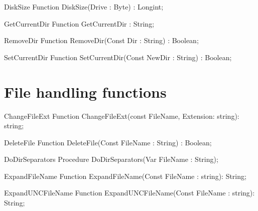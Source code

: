  
\begin{function}{DiskSize}
\Declaration
Function DiskSize(Drive : Byte) : Longint;
\Description
\Errors
\SeeAlso
\end{function}

 
\begin{function}{GetCurrentDir}
\Declaration
Function GetCurrentDir : String;
\Description
\Errors
\SeeAlso
\end{function}

 
\begin{function}{RemoveDir}
\Declaration
Function RemoveDir(Const Dir : String) : Boolean;
\Description
\Errors
\SeeAlso
\end{function}

 
\begin{function}{SetCurrentDir}
\Declaration
Function SetCurrentDir(Const NewDir : String) : Boolean;
\Description
\Errors
\SeeAlso
\end{function}

 


\section{File handling functions}

      
  
\begin{function}{ChangeFileExt}
\Declaration
Function ChangeFileExt(const FileName, Extension: string): string;
\Description
\Errors
\SeeAlso
\end{function}

 
\begin{function}{DeleteFile}
\Declaration
Function DeleteFile(Const FileName : String) : Boolean;
\Description
\Errors
\SeeAlso
\end{function}

 
\begin{procedure}{DoDirSeparators}
\Declaration
Procedure DoDirSeparators(Var FileName : String);
\Description
\Errors
\SeeAlso
\end{procedure}

 
\begin{function}{ExpandFileName}
\Declaration
Function ExpandFileName(Const FileName : string): String;
\Description
\Errors
\SeeAlso
\end{function}

 
\begin{function}{ExpandUNCFileName}
\Declaration
Function ExpandUNCFileName(Const FileName : string): String;
\Description
\Errors
\SeeAlso
\end{function}

